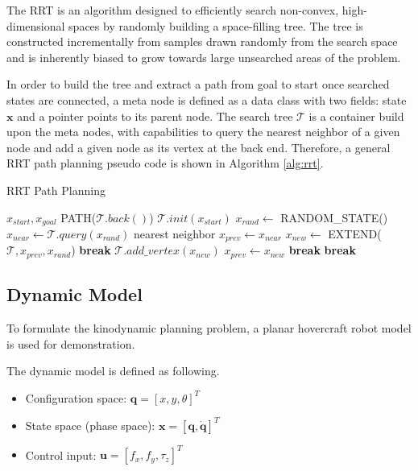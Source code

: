 \documentclass[11pt, conference]{IEEEtran}
\begin{document}
The RRT is an algorithm designed to efficiently search non-convex, high-dimensional spaces by randomly building a space-filling tree. The tree is constructed incrementally from samples drawn randomly from the search space and is inherently biased to grow towards large unsearched areas of the problem.

In order to build the tree and extract a path from goal to start once searched states are connected, a meta node is defined as a data class with two fields: state $\mathbf{x}$ and a pointer points to its parent node. The search tree $\mathcal{T}$ is a container build upon the meta nodes, with capabilities to query the nearest neighbor of a given node and add a given node as its vertex at the back end. Therefore, a general RRT path planning pseudo code is shown in Algorithm \ref{alg:rrt}.

\begin{algorithm}[htb]
    \caption{RRT Path Planning}
    \label{alg:rrt}
    \begin{algorithmic}
    \Require $x_{start}, x_{goal}$
    \Ensure PATH($\mathcal{T}.back()$)
    \State $\mathcal{T}.init(x_{start})$
        \State $x_{rand} \gets $ RANDOM\_STATE()
        \State $x_{near} \gets \mathcal{T}.query(x_{rand})$ \Comment nearest neighbor
        \State $x_{prev} \gets x_{near}$
            \State $x_{new} \gets $ EXTEND($\mathcal{T}, x_{prev}, x_{rand}$)
                \State \textbf{break}
            \EndIf
            \State $\mathcal{T}.add\_vertex(x_{new})$
            \State $x_{prev} \gets x_{new}$
                \State \textbf{break}
            \EndIf
        \EndWhile
            \State \textbf{break}
        \EndIf
    \EndFor
    \end{algorithmic}
\end{algorithm}

\subsection{Dynamic Model}
To formulate the kinodynamic planning problem, a planar hovercraft robot model is used for demonstration. 

The dynamic model is defined as following.

\begin{itemize}
    \item Configuration space: $\mathbf q = [x, y, \theta]^T$
    \item State space (phase space): $\mathbf x = [\mathbf q, \dot{\mathbf{q}}]^T$
    \item Control input: $\mathbf u = [f_x, f_y, \tau_z]^T$
\end{itemize}
\end{document}
